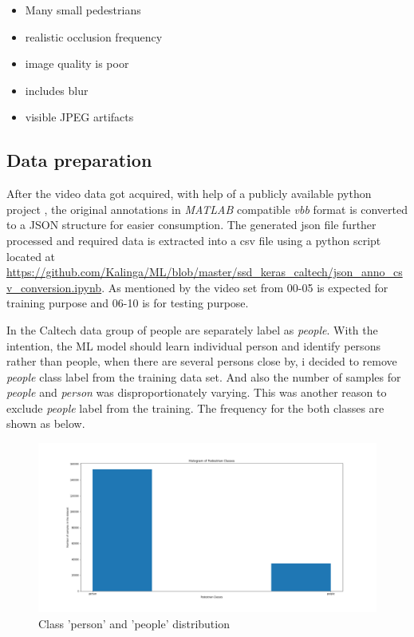 \begin{itemize}
	\setlength\itemsep{-1em}
	\item Many small pedestrians
	\item realistic occlusion frequency
	\item image quality is poor
	\item includes blur
	\item visible JPEG artifacts
\end{itemize}

\subsection{Data preparation}
After the video data got acquired, with help of a publicly available python project \cite{shuntasaito2015}, the original annotations in \textit{MATLAB} compatible \textit{vbb} format is converted to a JSON structure for easier consumption. The generated json file further processed and required data is extracted into a csv file using a python script located at \url{ https://github.com/Kalinga/ML/blob/master/ssd_keras_caltech/json_anno_csv_conversion.ipynb}. As mentioned by \cite{dollar2009pedestrian} the video set from 00-05 is expected for training purpose and 06-10 is for testing purpose.

In the Caltech data group of people are separately label as \textit{people}. With the intention, the ML model should learn individual person and identify persons rather than people, when there are several persons close by, i decided to remove \textit{people} class label from the training data set. And also the number of samples for \textit{people} and \textit{person} was disproportionately varying. This was another reason to exclude \textit{people }label from  the training. The frequency for the both classes are shown as below.

\begin{figure}[H]
\includegraphics[scale=0.4]{classid_distribution1_2}
\begin{center}
\caption{Class 'person' and 'people' distribution}
\end{center}
\end{figure}

